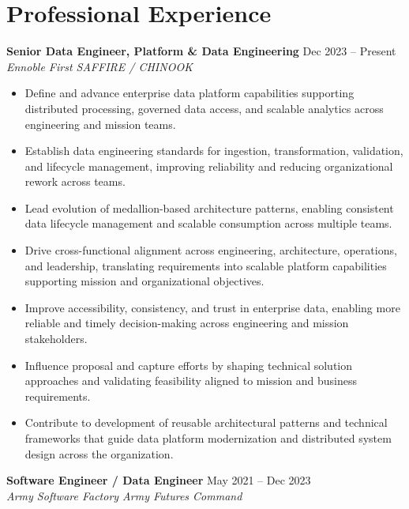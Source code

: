 \section{Professional Experience}

\textbf{Senior Data Engineer, Platform \& Data Engineering} \hfill Dec 2023 -- Present\\
\textit{Ennoble First \textbar{} SAFFIRE / CHINOOK}

\begin{itemize}
    \item Define and advance enterprise data platform capabilities supporting distributed processing, governed data access, and scalable analytics across engineering and mission teams.
    \item Establish data engineering standards for ingestion, transformation, validation, and lifecycle management, improving reliability and reducing organizational rework across teams.
    \item Lead evolution of medallion-based architecture patterns, enabling consistent data lifecycle management and scalable consumption across multiple teams.
    \item Drive cross-functional alignment across engineering, architecture, operations, and leadership, translating requirements into scalable platform capabilities supporting mission and organizational objectives.
    \item Improve accessibility, consistency, and trust in enterprise data, enabling more reliable and timely decision-making across engineering and mission stakeholders.
    \item Influence proposal and capture efforts by shaping technical solution approaches and validating feasibility aligned to mission and business requirements.
    \item Contribute to development of reusable architectural patterns and technical frameworks that guide data platform modernization and distributed system design across the organization.
\end{itemize}

\vspace{4pt}

\textbf{Software Engineer / Data Engineer} \hfill May 2021 -- Dec 2023\\
\textit{Army Software Factory \textbar{} Army Futures Command}

